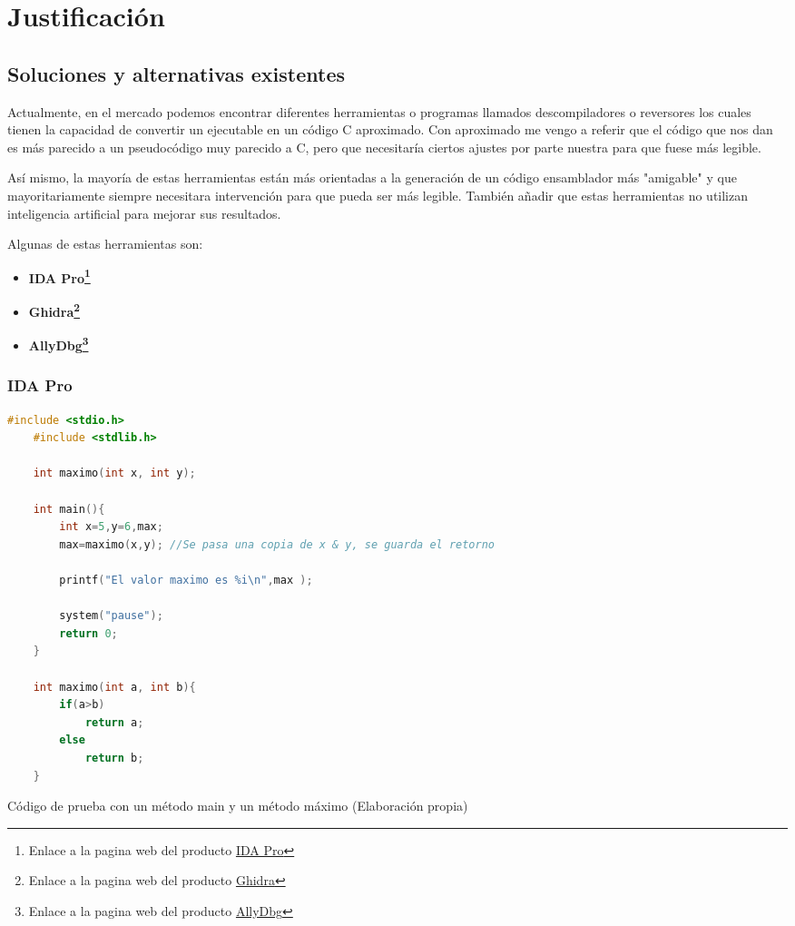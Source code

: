 \chapter{Justificación}
\label{cap:justificacion}

\section{Soluciones y alternativas existentes}
\label{sec:alternativas}

Actualmente, en el mercado podemos encontrar diferentes herramientas o programas llamados descompiladores o reversores los cuales tienen la capacidad de convertir un ejecutable
en un código C aproximado. Con aproximado me vengo a referir que el código que nos dan es más parecido a un pseudocódigo muy parecido a C, pero que necesitaría ciertos ajustes
por parte nuestra para que fuese más legible.

Así mismo, la mayoría de estas herramientas están más orientadas a la generación de un código ensamblador más "amigable" y que mayoritariamente siempre necesitara intervención
para que pueda ser más legible. También añadir que estas herramientas no utilizan inteligencia artificial para mejorar sus resultados.

Algunas de estas herramientas son:

\begin{itemize}
    \item \bf IDA Pro\footnote{Enlace a la pagina web del producto \href{https://hex-rays.com/ida-pro/}{IDA Pro}}
    \item \bf Ghidra\footnote{Enlace a la pagina web del producto \href{https://ghidra-sre.org/}{Ghidra}}
    \item \bf AllyDbg\footnote{Enlace a la pagina web del producto \href{https://www.ollydbg.de/}{AllyDbg}}
\end{itemize}

\subsection{IDA Pro}
\label{subsec:IDA_pro}

\begin{code}[h]
    \begin{lstlisting}[language=C++]
    #include <stdio.h>
    #include <stdlib.h>

    int maximo(int x, int y);

    int main(){
        int x=5,y=6,max;
        max=maximo(x,y); //Se pasa una copia de x & y, se guarda el retorno

        printf("El valor maximo es %i\n",max );

        system("pause");
        return 0;
    }

    int maximo(int a, int b){
        if(a>b)
            return a;
        else
            return b;
    }
    \end{lstlisting}
    \caption[Código de prueba con un método main y un método máximo]{Código de prueba con un método main y un método máximo (Elaboración propia)}
    \label{cod:codigo_prueba}
\end{code}
    

